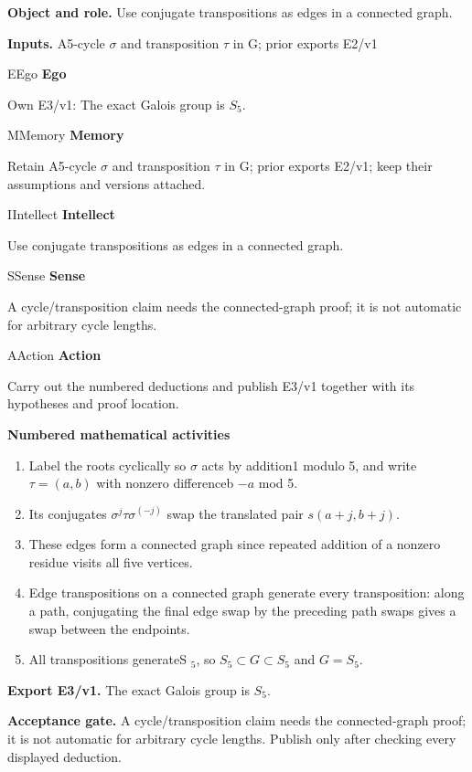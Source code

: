 \documentclass[preprint,12pt,aps,pra,showkeys,amsmath,amssymb,superscriptaddress,floatfix]{revtex4-2}
\theoremstyle{definition}
\theoremstyle{remark}
\newcommand{\mmfaculty}[3]{%
 \begin{mmfacultybox}{#1}{#2}
 {\sffamily\bfseries\color{MMBlue}#2}\par\smallskip #3
 \end{mmfacultybox}}
\newcommand{\field}[2]{\par\smallskip\noindent\textbf{#1.} #2\par}
\begin{document}
\field{Object and role}{Use conjugate transpositions as edges in a connected graph.}

\field{Inputs}{A5-cycle \(\sigma\) and transposition \(\tau\) in G; prior exports E2/v1}

\mmfaculty{E}{Ego}{Own E3/v1: The exact Galois group is \(S_{5}\).}

\mmfaculty{M}{Memory}{Retain A5-cycle \(\sigma\) and transposition \(\tau\) in G; prior
exports E2/v1; keep their assumptions and versions attached.}

\mmfaculty{I}{Intellect}{Use conjugate transpositions as edges in a connected graph.}

\mmfaculty{S}{Sense}{A cycle/transposition claim needs the connected-graph proof; it is not
automatic for arbitrary cycle lengths.}

\mmfaculty{A}{Action}{Carry out the numbered deductions and publish E3/v1 together with its
hypotheses and proof location.}

\smallskip\noindent\textbf{Numbered mathematical activities}

\begin{enumerate}[label=N3.\arabic*,leftmargin=3.4em]

\item Label the roots cyclically so \(\sigma\) acts by addition1 modulo 5, and
write \(\tau =(a,b)\) with nonzero differenceb \(-a\) mod 5.

\item Its conjugates \(\sigma ^j\tau \sigma ^{(-j)}\) swap the translated pair
\(s(a+j,b+j)\).

\item These edges form a connected graph since repeated addition of a nonzero
residue visits all five vertices.

\item Edge transpositions on a connected graph generate every transposition:
along a path, conjugating the final edge swap by the preceding path
swaps gives a swap between the endpoints.

\item All transpositions generateS \(_{5}\), so
\(S_{5}\subset G\subset S_{5}\) and \(G=S_{5}\).

\end{enumerate}

\field{Export E3/v1}{The exact Galois group is \(S_{5}\).}

\field{Acceptance gate}{A cycle/transposition claim needs the connected-graph proof; it is not
automatic for arbitrary cycle lengths. Publish only after checking every
displayed deduction.}
\end{document}
